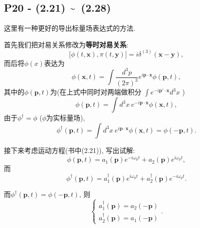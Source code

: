 \subsection{P20 - (2.21) \textasciitilde \ (2.28)} \label{subsubsec: KG_Field_expression}

这里有一种更好的导出标量场表达式的方法.

首先我们把对易关系修改为\textbf{等时对易关系}:
\begin{equation}
  \bigl[\phi(t, \mathbf{x}), \pi(t, \mathbf{y})\bigr] = i\delta^{(3)}(\mathbf{x} - \mathbf{y}),
\end{equation}
而后将$\phi(x)$表达为
\begin{equation}
  \phi(\mathbf{x}, t) = \int \frac{d^3 p}{(2\pi)^3}e^{i\mathbf{p \cdot x}}\phi(\mathbf{p}, t),
\end{equation}
其中的$\phi(\mathbf{p}, t)$为(在上式中同时对两端做积分 $\int e^{-i\mathbf{p'\cdot x}} d^3 x$ )
\begin{equation}
  \phi(\mathbf{p}, t) = \int d^3 x\ e^{-i\mathbf{p \cdot x}}\phi(\mathbf{x}, t),
\end{equation}
由于$\phi^\dagger = \phi$ ($\phi$为实标量场),
\begin{equation}
  \phi^{\dagger}(\mathbf{p}, t) = \int d^3 x\ e^{i\mathbf{p \cdot x}}\phi(\mathbf{x}, t) = \phi(-\mathbf{p}, t).
\end{equation}

接下来考虑运动方程(书中(2.21)), 写出试解:
\begin{equation}
  \phi(\mathbf{p}, t) = a_1(\mathbf{p})e^{-i\omega_p t} + a_2(\mathbf{p})e^{i\omega_p t},
\end{equation}
而
\begin{equation}
  \phi^{\dagger}(\mathbf{p}, t) = a_1^{\dagger}(\mathbf{p})e^{i\omega_p t} + a_2^{\dagger}(\mathbf{p})e^{-i\omega_p t}.
\end{equation}

而$\phi^{\dagger}(\mathbf{p}, t) = \phi(-\mathbf{p}, t)$, 则
\begin{equation}
  \left\{\begin{array}{c} a_1^{\dagger}(\mathbf{p}) = a_2(\mathbf{-p})\\ a_2^{\dagger}(\mathbf{p}) = a_1(\mathbf{-p})\end{array}\right..
\end{equation}

